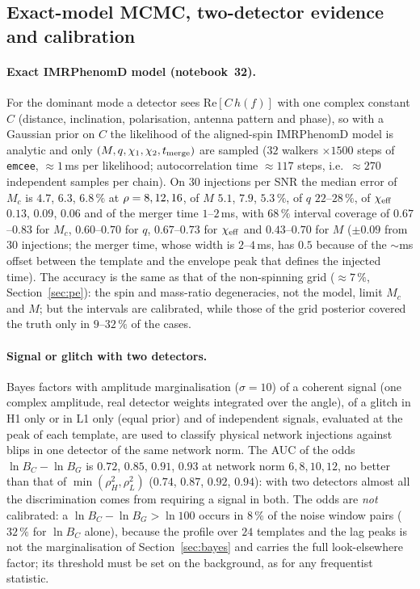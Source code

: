 \subsection{Exact-model MCMC, two-detector evidence and calibration}\label{sec:bayesext}
\paragraph{Exact IMRPhenomD model (notebook~32).} For the dominant mode a detector sees $\mathrm{Re}[C\,h(f)]$ with one complex constant $C$ (distance, inclination, polarisation, antenna pattern and phase), so with a Gaussian prior on $C$ the likelihood of the aligned-spin IMRPhenomD model is analytic and only $(M,q,\chi_1,\chi_2,t_{\rm merge})$ are sampled ($32$ walkers $\times1500$ steps of \texttt{emcee}, $\approx1$\,ms per likelihood; autocorrelation time $\approx117$ steps, i.e.\ $\approx270$ independent samples per chain). On $30$ injections per SNR the median error of $M_c$ is $4.7$, $6.3$, $6.8\,\%$ at $\rho=8,12,16$, of $M$ $5.1$, $7.9$, $5.3\,\%$, of $q$ $22$--$28\,\%$, of $\chi_{\rm eff}$ $0.13$, $0.09$, $0.06$ and of the merger time $1$--$2\,$ms, with $68\,\%$ interval coverage of $0.67$--$0.83$ for $M_c$, $0.60$--$0.70$ for $q$, $0.67$--$0.73$ for $\chi_{\rm eff}$ and $0.43$--$0.70$ for $M$ ($\pm0.09$ from $30$ injections; the merger time, whose width is $2$--$4\,$ms, has $0.5$ because of the $\sim$ms offset between the template and the envelope peak that defines the injected time). The accuracy is the same as that of the non-spinning grid ($\approx7\,\%$, Section~\ref{sec:pe}): the spin and mass-ratio degeneracies, not the model, limit $M_c$ and $M$; but the intervals are calibrated, while those of the grid posterior covered the truth only in $9$--$32\,\%$ of the cases.
\paragraph{Signal or glitch with two detectors.} Bayes factors with amplitude marginalisation ($\sigma=10$) of a coherent signal (one complex amplitude, real detector weights integrated over the angle), of a glitch in H1 only or in L1 only (equal prior) and of independent signals, evaluated at the peak of each template, are used to classify physical network injections against blips in one detector of the same network norm. The AUC of the odds $\ln B_C-\ln B_G$ is $0.72$, $0.85$, $0.91$, $0.93$ at network norm $6,8,10,12$, no better than that of $\min(\rho_H^2,\rho_L^2)$ ($0.74$, $0.87$, $0.92$, $0.94$): with two detectors almost all the discrimination comes from requiring a signal in both. The odds are \emph{not} calibrated: a $\ln B_C-\ln B_G>\ln100$ occurs in $8\,\%$ of the noise window pairs ($32\,\%$ for $\ln B_C$ alone), because the profile over $24$ templates and the lag peaks is not the marginalisation of Section~\ref{sec:bayes} and carries the full look-elsewhere factor; its threshold must be set on the background, as for any frequentist statistic.
